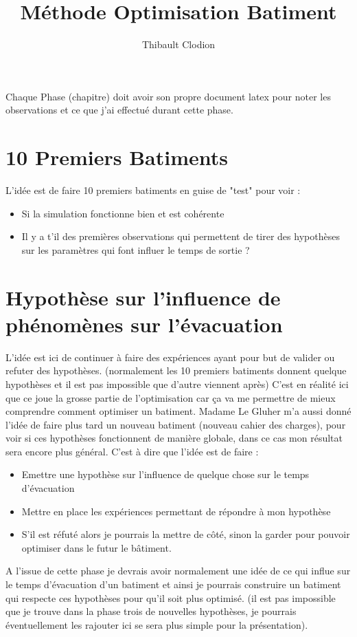 \documentclass[12pt]{article}
\title{Méthode Optimisation Batiment}
\author{Thibault Clodion}
\begin{document}
\maketitle %

Chaque Phase (chapitre) doit avoir son propre document latex pour noter les observations et ce que j'ai effectué durant cette phase.

\section{10 Premiers Batiments}

L'idée est de faire 10 premiers batiments en guise de "test" pour voir :
\begin{itemize}
    \item Si la simulation fonctionne bien et est cohérente
    \item Il y a t'il des premières observations qui permettent de tirer des hypothèses
    sur les paramètres qui font influer le temps de sortie ?
\end{itemize}

\section{Hypothèse sur l'influence de phénomènes sur l'évacuation}

L'idée est ici de continuer à faire des expériences ayant pour but de valider ou refuter des hypothèses.
(normalement les 10 premiers batiments donnent quelque hypothèses et il est pas impossible que d'autre viennent après)
\newline\newline
C'est en réalité ici que ce joue la grosse partie de l'optimisation car ça va me permettre de mieux comprendre comment optimiser un batiment.
Madame Le Gluher m'a aussi donné l'idée de faire plus tard un nouveau batiment (nouveau cahier des charges), pour voir si ces hypothèses
fonctionnent de manière globale, dans ce cas mon résultat sera encore plus général.
\newline\newline
C'est à dire que l'idée est de faire :
\begin{itemize}
    \item Emettre une hypothèse sur l'influence de quelque chose sur le temps d'évacuation
    \item Mettre en place les expériences permettant de répondre à mon hypothèse
    \item S'il est réfuté alors je pourrais la mettre de côté, sinon la garder pour pouvoir optimiser dans le futur
    le bâtiment.
\end{itemize}

A l'issue de cette phase je devrais avoir normalement une idée de ce qui influe sur le temps d'évacuation d'un batiment
et ainsi je pourrais construire un batiment qui respecte ces hypothèses pour qu'il soit plus optimisé. (il est pas impossible que je trouve
dans la phase trois de nouvelles hypothèses, je pourrais éventuellement les rajouter ici se sera plus simple pour la présentation).
\end{document}
